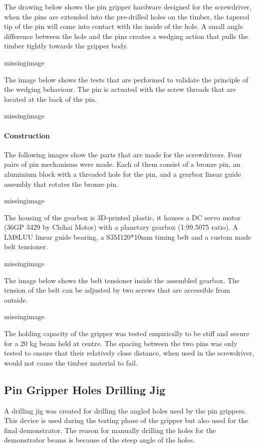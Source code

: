 The drawing below shows the pin gripper hardware designed for the screwdriver, when the pins are extended into the pre-drilled holes on the timber, the tapered tip of the pin will come into contact with the inside of the hole. A small angle difference between the hole and the pins creates a wedging action that pulls the timber tightly towards the gripper body.  

missingimage

The image below shows the tests that are performed to validate the principle of the wedging behaviour. The pin is actuated with the screw threads that are located at the back of the pin. 

missingimage

\paragraph{Construction}
The following images show the parts that are made for the screwdrivers. Four pairs of pin mechanisms were made. Each of them consist of a bronze pin, an aluminium block with a threaded hole for the pin, and a gearbox linear guide assembly that rotates the bronze pin.

missingimage

The housing of the gearbox is 3D-printed plastic, it houses a DC servo motor (36GP 3429 by Chihai Motor) with a planetary gearbox (1:99.5075 ratio). A LM8LUU linear guide bearing, a S3M120*10mm timing belt and a custom made belt tensioner.

missingimage

The image below shows the belt tensioner inside the assembled gearbox. The tension of the belt can be adjusted by two screws that are accessible from outside.

missingimage

The holding capacity of the gripper was tested empirically to be stiff and secure for a 20 kg beam held at centre. The spacing between the two pins was only tested to ensure that their relatively close distance, when used in the screwdriver, would not cause the timber material to fail. 

\subsection{Pin Gripper Holes Drilling Jig}
\label{subsection:exploration-4-pin-gripper-holes-drilling-jig}

A drilling jig was created for drilling the angled holes used by the pin grippers. This device is used during the testing phase of the gripper but also used for the final demonstrator. The reason for manually drilling the holes for the demonstrator beams is because of the steep angle of the holes. 

